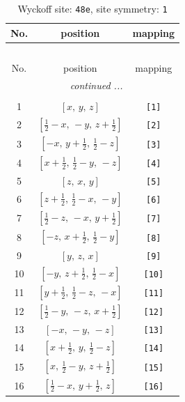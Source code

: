 \documentclass[fleqn,8pt]{jsarticle}
\begin{document}
\begin{longtable}{ccc}
\caption{Wyckoff site: {\tt 48e}, site symmetry: {\tt 1}}
 \\
 \hline \hline
No. & position & mapping \\ \hline \endfirsthead

\multicolumn{2}{l}{\tablename\ \thetable{}} \\
 \hline \hline
No. & position & mapping \\ \hline \endhead

 \hline \hline
\multicolumn{2}{r}{\footnotesize\it continued ...} \\ \endfoot

 \hline \hline
\multicolumn{2}{r}{} \\ \endlastfoot

1 & $\left[ x,\, y,\, z \right]$ & {\tt [1]} \\ \hline
2 & $\left[ \frac{1}{2} - x,\, - y,\, z + \frac{1}{2} \right]$ & {\tt [2]} \\ \hline
3 & $\left[ - x,\, y + \frac{1}{2},\, \frac{1}{2} - z \right]$ & {\tt [3]} \\ \hline
4 & $\left[ x + \frac{1}{2},\, \frac{1}{2} - y,\, - z \right]$ & {\tt [4]} \\ \hline
5 & $\left[ z,\, x,\, y \right]$ & {\tt [5]} \\ \hline
6 & $\left[ z + \frac{1}{2},\, \frac{1}{2} - x,\, - y \right]$ & {\tt [6]} \\ \hline
7 & $\left[ \frac{1}{2} - z,\, - x,\, y + \frac{1}{2} \right]$ & {\tt [7]} \\ \hline
8 & $\left[ - z,\, x + \frac{1}{2},\, \frac{1}{2} - y \right]$ & {\tt [8]} \\ \hline
9 & $\left[ y,\, z,\, x \right]$ & {\tt [9]} \\ \hline
10 & $\left[ - y,\, z + \frac{1}{2},\, \frac{1}{2} - x \right]$ & {\tt [10]} \\ \hline
11 & $\left[ y + \frac{1}{2},\, \frac{1}{2} - z,\, - x \right]$ & {\tt [11]} \\ \hline
12 & $\left[ \frac{1}{2} - y,\, - z,\, x + \frac{1}{2} \right]$ & {\tt [12]} \\ \hline
13 & $\left[ - x,\, - y,\, - z \right]$ & {\tt [13]} \\ \hline
14 & $\left[ x + \frac{1}{2},\, y,\, \frac{1}{2} - z \right]$ & {\tt [14]} \\ \hline
15 & $\left[ x,\, \frac{1}{2} - y,\, z + \frac{1}{2} \right]$ & {\tt [15]} \\ \hline
16 & $\left[ \frac{1}{2} - x,\, y + \frac{1}{2},\, z \right]$ & {\tt [16]} \\ \hline

\end{longtable}
\end{document}
